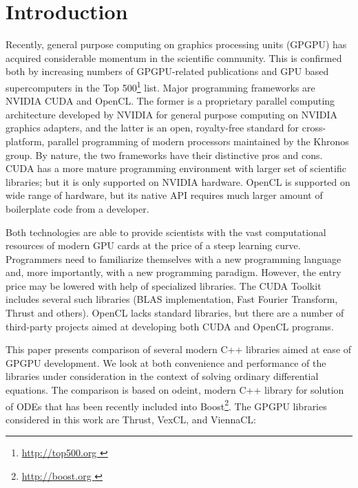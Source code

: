 \documentclass[1p]{elsarticle}
\begin{document}
%
%
\section{Introduction}

Recently, general purpose computing on graphics processing units (GPGPU) has
acquired considerable momentum in the scientific community. This is confirmed
both by increasing numbers of GPGPU-related publications and GPU based
supercomputers in the Top 500\footnote{ \href{ http://top500.org }{
http://top500.org }} list. Major programming frameworks are NVIDIA CUDA and
OpenCL.  The former is a proprietary parallel computing architecture developed
by NVIDIA for general purpose computing on NVIDIA graphics adapters, and the
latter is an open, royalty-free standard for cross-platform, parallel
programming of modern processors maintained by the Khronos group. By nature,
the two frameworks have their distinctive pros and cons. CUDA has a more mature
programming environment with larger set of scientific libraries; but it is only
supported on NVIDIA hardware. OpenCL is supported on wide range of hardware,
but its native API requires much larger amount of boilerplate code from a
developer.

Both technologies are able to provide scientists with the vast computational
resources of modern GPU cards at the price of a steep learning curve.
Programmers need to familiarize
themselves with a new programming language and, more importantly, with a
new programming paradigm. However, the entry price may be lowered with help of
specialized libraries. The CUDA Toolkit includes several such libraries (BLAS
implementation, Fast Fourier Transform, Thrust and others). OpenCL lacks
standard libraries, but there are a number of third-party projects aimed at
developing both CUDA and OpenCL programs.

This paper presents comparison of several modern C++ libraries aimed at ease of
GPGPU development. We look at both convenience and performance of the libraries
under consideration in the context of solving ordinary differential equations.
The comparison is based on odeint, modern C++ library for solution of ODEs that
has been recently included into Boost\footnote{ \href{ http://boost.org } {
http://boost.org } }.  The GPGPU libraries considered in this work are Thrust,
VexCL, and ViennaCL:

\end{document}
